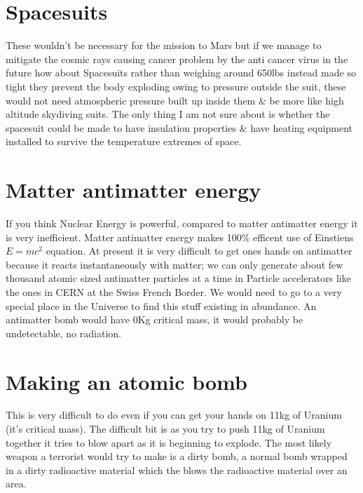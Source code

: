 \documentclass[a4paper,12pt,titlepage]{book}
\begin{document}
\section{Spacesuits}
These wouldn't be necessary for the mission to Mars but
if we manage to mitigate the cosmic rays
causing cancer problem by the anti cancer virus
in the future how about Spacesuits rather than 
weighing around 650lbs instead made so tight
they prevent the body exploding owing to pressure 
outside the suit, these would not need atmospheric pressure 
built up inside them \& be more like high altitude skydiving suits.
The only thing I am not sure about is whether the spacesuit
could be made to have insulation properties \& have heating
equipment installed to survive the temperature extremes of space.

\section{Matter antimatter energy}
If you think Nuclear Energy is powerful,
compared to matter antimatter energy it
is very inefficient. Matter antimatter energy
makes 100\% efficent use of Einstiens
\begin{math} 
E=mc^{2} 
\end{math}
equation.
At present it is very difficult to get
ones hands on antimatter because it reacts
instantaneously with matter; we can only
generate about few thousand atomic sized antimatter particles
at a time in Particle accelerators like the
ones in CERN at the Swiss French Border.
We would need to go to a very special place
in the Universe to find this stuff existing 
in abundance.
An antimatter bomb would have 0Kg critical mass,
it would probably be undetectable, no radiation.

\section{Making an atomic bomb}
This is very difficult to do even if you can
get your hands on 11kg of Uranium (it's critical mass).
The difficult bit is as you try to push 11kg of
Uranium together it tries to blow apart as it is
beginning to explode.
The most likely weapon a terrorist would try to
make is a dirty bomb, a normal bomb wrapped
in a dirty radioactive material which the blows
the radioactive material over an area.
\end{document}
